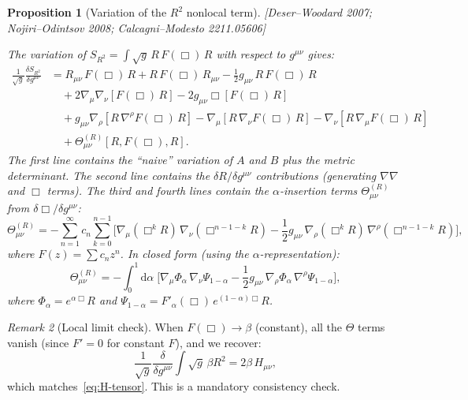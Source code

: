 \documentclass[12pt,a4paper]{article}
\newtheorem{proposition}{Proposition}[section]
\theoremstyle{definition}
\theoremstyle{remark}
\newtheorem{remark}[proposition]{Remark}
\newcommand{\dd}{\mathrm{d}}
\newcommand{\fromlit}[1]{\textcolor{blue!70!black}{\textsf{[#1]}}}
\begin{document}
\begin{proposition}[Variation of the $R^2$ nonlocal term]
\label{prop:var-RFR}
\fromlit{Deser--Woodard 2007; Nojiri--Odintsov 2008;
Calcagni--Modesto 2211.05606}

The variation of $S_{R^2} = \int\sqrt{g}\,R\,F(\Box)\,R$ with respect
to $g^{\mu\nu}$ gives:
\begin{equation}\label{eq:var-RFR}
\begin{split}
  \frac{1}{\sqrt{g}}\frac{\delta S_{R^2}}{\delta g^{\mu\nu}}
  &= R_{\mu\nu}\,F(\Box)\,R
    + R\,F(\Box)\,R_{\mu\nu}
    - \frac{1}{2}g_{\mu\nu}\,R\,F(\Box)\,R \\
  &\quad + 2\nabla_\mu\nabla_\nu[F(\Box)\,R]
    - 2g_{\mu\nu}\Box[F(\Box)\,R] \\
  &\quad + g_{\mu\nu}\nabla_\rho[R\,\nabla^\rho F(\Box)\,R]
    - \nabla_\mu[R\,\nabla_\nu F(\Box)\,R]
    - \nabla_\nu[R\,\nabla_\mu F(\Box)\,R] \\
  &\quad + \Theta_{\mu\nu}^{(R)}[R, F(\Box), R].
\end{split}
\end{equation}
The first line contains the ``naive'' variation of $A$ and $B$
plus the metric determinant.  The second line contains the
$\delta R/\delta g^{\mu\nu}$ contributions (generating $\nabla\nabla$
and $\Box$ terms).  The third and fourth lines contain the
$\alpha$-insertion terms $\Theta_{\mu\nu}^{(R)}$ from
$\delta\Box/\delta g^{\mu\nu}$:
\begin{equation}\label{eq:Theta-R}
  \Theta_{\mu\nu}^{(R)}
  = -\sum_{n=1}^\infty c_n \sum_{k=0}^{n-1}
    \Big[
      \nabla_\mu(\Box^k R)\,\nabla_\nu(\Box^{n-1-k} R)
      - \frac{1}{2}g_{\mu\nu}\,
        \nabla_\rho(\Box^k R)\,\nabla^\rho(\Box^{n-1-k} R)
    \Big],
\end{equation}
where $F(z) = \sum c_n z^n$.  In closed form (using the
$\alpha$-representation):
\begin{equation}\label{eq:Theta-R-closed}
  \Theta_{\mu\nu}^{(R)} = -\int_0^1\!\dd\alpha\;
    \Big[
      \nabla_\mu\Phi_\alpha\,\nabla_\nu\Psi_{1-\alpha}
      - \frac{1}{2}g_{\mu\nu}\,
        \nabla_\rho\Phi_\alpha\,\nabla^\rho\Psi_{1-\alpha}
    \Big],
\end{equation}
where $\Phi_\alpha = e^{\alpha\Box}R$ and
$\Psi_{1-\alpha} = F'_\alpha(\Box)\,e^{(1-\alpha)\Box}R$.
\end{proposition}

\begin{remark}[Local limit check]
When $F(\Box) \to \beta$ (constant), all the $\Theta$ terms vanish
(since $F' = 0$ for constant $F$), and we recover:
\begin{equation}
  \frac{1}{\sqrt{g}}\frac{\delta}{\delta g^{\mu\nu}}
  \int\sqrt{g}\,\beta R^2
  = 2\beta\,H_{\mu\nu},
\end{equation}
which matches~\eqref{eq:H-tensor}.  This is a mandatory consistency
check.
\end{remark}
\end{document}
